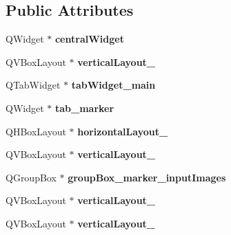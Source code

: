 \subsection*{Public Attributes}
\begin{DoxyCompactItemize}
\item 
\mbox{\label{class_ui___main_window_a30075506c2116c3ed4ff25e07ae75f81}} 
Q\+Widget $\ast$ {\bfseries central\+Widget}
\item 
\mbox{\label{class_ui___main_window_aaa8cc393d5a44562d629a9f646d2c6dd}} 
Q\+V\+Box\+Layout $\ast$ {\bfseries vertical\+Layout\+\_}
\item 
\mbox{\label{class_ui___main_window_aeecf8d54f53e8cc43bc40fb24b88af2f}} 
Q\+Tab\+Widget $\ast$ {\bfseries tab\+Widget\+\_\+main}
\item 
\mbox{\label{class_ui___main_window_a5b94e7f4a065bfa9ab8d338940b3a34c}} 
Q\+Widget $\ast$ {\bfseries tab\+\_\+marker}
\item 
\mbox{\label{class_ui___main_window_a1351e317cba7ca711b6b4d2212b6bf36}} 
Q\+H\+Box\+Layout $\ast$ {\bfseries horizontal\+Layout\+\_}
\item 
\mbox{\label{class_ui___main_window_afcc20a3d5058037a00cdc6122f231848}} 
Q\+V\+Box\+Layout $\ast$ {\bfseries vertical\+Layout\+\_}
\item 
\mbox{\label{class_ui___main_window_a260172fa8f225507cf8bab93e75fd80d}} 
Q\+Group\+Box $\ast$ {\bfseries group\+Box\+\_\+marker\+\_\+input\+Images}
\item 
\mbox{\label{class_ui___main_window_afb1464f1d82290bdb55ce9c30a62c2c5}} 
Q\+V\+Box\+Layout $\ast$ {\bfseries vertical\+Layout\+\_}
\item 
\mbox{\label{class_ui___main_window_a38b8a4b887f3b58e2a49e7905ae6f1f0}} 
Q\+V\+Box\+Layout $\ast$ {\bfseries vertical\+Layout\+\_}
\item 
\mbox{\label{class_ui___main_window_af384108904d359a1ee9acb8a5f1449ee}} 

\end{DoxyCompactItemize}
